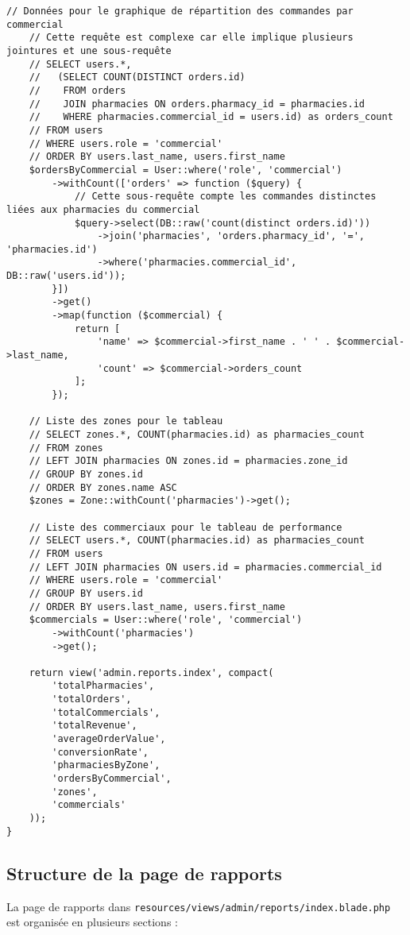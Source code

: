 \documentclass[12pt,a4paper]{article}
\begin{document}
\begin{lstlisting}[caption=Méthode index du ReportController]
    // Données pour le graphique de répartition des commandes par commercial
    // Cette requête est complexe car elle implique plusieurs jointures et une sous-requête
    // SELECT users.*, 
    //   (SELECT COUNT(DISTINCT orders.id) 
    //    FROM orders 
    //    JOIN pharmacies ON orders.pharmacy_id = pharmacies.id 
    //    WHERE pharmacies.commercial_id = users.id) as orders_count
    // FROM users
    // WHERE users.role = 'commercial'
    // ORDER BY users.last_name, users.first_name
    $ordersByCommercial = User::where('role', 'commercial')
        ->withCount(['orders' => function ($query) {
            // Cette sous-requête compte les commandes distinctes liées aux pharmacies du commercial
            $query->select(DB::raw('count(distinct orders.id)'))
                ->join('pharmacies', 'orders.pharmacy_id', '=', 'pharmacies.id')
                ->where('pharmacies.commercial_id', DB::raw('users.id'));
        }])
        ->get()
        ->map(function ($commercial) {
            return [
                'name' => $commercial->first_name . ' ' . $commercial->last_name,
                'count' => $commercial->orders_count
            ];
        });
    
    // Liste des zones pour le tableau
    // SELECT zones.*, COUNT(pharmacies.id) as pharmacies_count 
    // FROM zones
    // LEFT JOIN pharmacies ON zones.id = pharmacies.zone_id
    // GROUP BY zones.id
    // ORDER BY zones.name ASC
    $zones = Zone::withCount('pharmacies')->get();
    
    // Liste des commerciaux pour le tableau de performance
    // SELECT users.*, COUNT(pharmacies.id) as pharmacies_count
    // FROM users
    // LEFT JOIN pharmacies ON users.id = pharmacies.commercial_id
    // WHERE users.role = 'commercial'
    // GROUP BY users.id
    // ORDER BY users.last_name, users.first_name
    $commercials = User::where('role', 'commercial')
        ->withCount('pharmacies')
        ->get();
    
    return view('admin.reports.index', compact(
        'totalPharmacies',
        'totalOrders',
        'totalCommercials',
        'totalRevenue',
        'averageOrderValue',
        'conversionRate',
        'pharmaciesByZone',
        'ordersByCommercial',
        'zones',
        'commercials'
    ));
}
\end{lstlisting}

\subsection{Structure de la page de rapports}
La page de rapports dans \texttt{resources/views/admin/reports/index.blade.php} est organisée en plusieurs sections :
\end{document}
